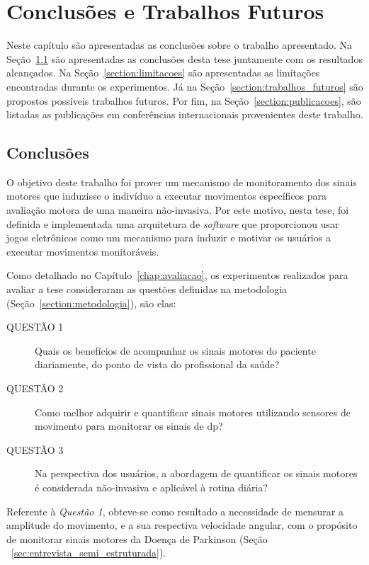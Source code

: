 \chapter{Conclusões e Trabalhos Futuros}\label{chapter:conclusoes_futuros}
Neste capítulo são apresentadas as conclusões sobre o trabalho apresentado. Na Seção~\ref{section:conclusoes} são apresentadas as conclusões desta tese juntamente com os resultados alcançados. Na Seção~\ref{section:limitacoes} são apresentadas as limitações encontradas durante os experimentos. Já na Seção~\ref{section:trabalhos_futuros} são propostos possíveis trabalhos futuros. Por fim, na Seção~\ref{section:publicacoes}, são listadas as publicações em conferências internacionais provenientes deste trabalho.




\section{Conclusões}\label{section:conclusoes}
O objetivo deste trabalho foi prover um mecanismo de monitoramento dos sinais motores que induzisse o indivíduo a executar movimentos específicos para avaliação motora de uma maneira não-invasiva. Por este motivo, nesta tese, foi definida e implementada uma arquitetura de \textit{software} que proporcionou usar jogos eletrônicos como um mecanismo para induzir e motivar os usuários a executar movimentos monitoráveis.


Como detalhado no Capítulo~\ref{chap:avaliacao}, os experimentos realizados para avaliar a tese consideraram as questões definidas na metodologia (Seção~\ref{section:metodologia}), são elas:
	\begin{description}
	\item[QUESTÃO 1] Quais os benefícios de acompanhar os sinais motores do paciente diariamente, do ponto de vista do profissional da saúde?
	\item[QUESTÃO 2] Como melhor adquirir e quantificar sinais motores utilizando sensores de movimento para monitorar os sinais de \ac{dp}?
	\item[QUESTÃO 3] Na perspectiva dos usuários, a abordagem de quantificar os sinais motores é considerada não-invasiva e aplicável à rotina diária?
	\end{description}

Referente à \textit{Questão 1}, obteve-se como resultado a necessidade de mensurar a amplitude do movimento, e a sua respectiva velocidade angular, com o propósito de monitorar sinais motores da Doença de Parkinson (Seção ~\ref{sec:entrevista_semi_estruturada}).

